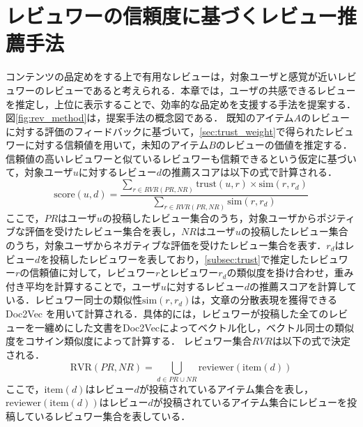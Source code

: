 \documentclass[a4paper,11pt,oneside,openany]{jsbook}
\begin{document}
	\section{レビュワーの信頼度に基づくレビュー推薦手法}
コンテンツの品定めをする上で有用なレビューは，対象ユーザと感覚が近いレビュワーのレビューであると考えられる．本章では，ユーザの共感できるレビューを推定し，上位に表示することで、効率的な品定めを支援する手法を提案する．図\ref{fig:rev_method}は，提案手法の概念図である．
既知のアイテム$A$のレビューに対する評価のフィードバックに基づいて，\ref{sec:trust_weight}で得られたレビュワーに対する信頼値を用いて，未知のアイテム$B$のレビューの価値を推定する．信頼値の高いレビュワーと似ているレビュワーも信頼できるという仮定に基づいて，対象ユーザ$u$に対するレビュー$d$の推薦スコアは以下の式で計算される．
\begin{equation}
\mathrm{score}(u ,d)=\frac{\sum_{r\in{RVR(PR, NR)}} \mathrm{trust}(u,r) \times \mathrm{sim}(r, r_d)}{\sum_{r\in{RVR(PR, NR)}} \mathrm{sim}(r, r_d)}
\end{equation}
ここで，$PR$はユーザ$u$の投稿したレビュー集合のうち，対象ユーザからポジティブな評価を受けたレビュー集合を表し，$NR$はユーザ$u$の投稿したレビュー集合のうち，対象ユーザからネガティブな評価を受けたレビュー集合を表す．$r_d$はレビュー$d$を投稿したレビュワーを表しており，\ref{subsec:trust}で推定したレビュワー$r$の信頼値に対して，レビュワー$r$とレビュワー$r_d$の類似度を掛け合わせ，重み付き平均を計算することで，ユーザ$u$に対するレビュー$d$の推薦スコアを計算している．レビュワー同士の類似性$\mathrm{sim}(r, r_d)$は，文章の分散表現を獲得できるDoc2Vec \cite{doc2vec} を用いて計算される．具体的には，レビュワーが投稿した全てのレビューを一纏めにした文書をDoc2Vecによってベクトル化し，ベクトル同士の類似度をコサイン類似度によって計算する．
レビュワー集合$RVR$は以下の式で決定される．
\begin{equation}
\mathrm{RVR}(PR ,NR)=\bigcup_{d\in{PR\cup NR}} \mathrm{reviewer}(\mathrm{item}(d))
\end{equation}
ここで，$\mathrm{item}(d)$はレビュー$d$が投稿されているアイテム集合を表し，$\mathrm{reviewer}(\mathrm{item}(d))$はレビュー$d$が投稿されているアイテム集合にレビューを投稿しているレビュワー集合を表している．
\end{document}
